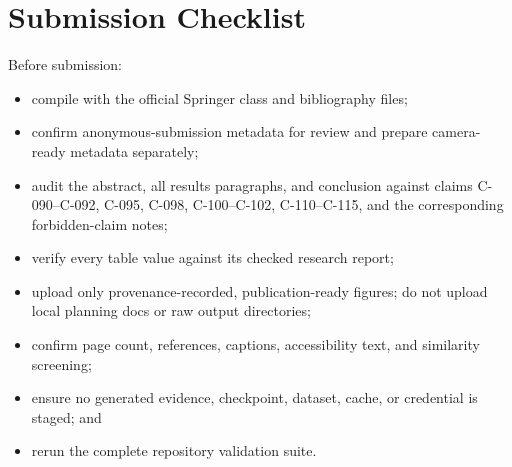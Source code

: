 \section{Submission Checklist}
\label{app:submission-checklist}

Before submission:
\begin{itemize}[leftmargin=*]
\item compile with the official Springer class and bibliography files;
\item confirm anonymous-submission metadata for review and prepare camera-ready metadata separately;
\item audit the abstract, all results paragraphs, and conclusion against claims C-090--C-092,
C-095, C-098, C-100--C-102, C-110--C-115, and the corresponding forbidden-claim notes;
\item verify every table value against its checked research report;
\item upload only provenance-recorded, publication-ready figures; do not upload local planning docs
or raw output directories;
\item confirm page count, references, captions, accessibility text, and similarity screening;
\item ensure no generated evidence, checkpoint, dataset, cache, or credential is staged; and
\item rerun the complete repository validation suite.
\end{itemize}
